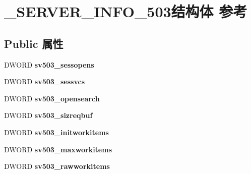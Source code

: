 \hypertarget{struct___s_e_r_v_e_r___i_n_f_o__503}{}\section{\+\_\+\+S\+E\+R\+V\+E\+R\+\_\+\+I\+N\+F\+O\+\_\+503结构体 参考}
\label{struct___s_e_r_v_e_r___i_n_f_o__503}
\subsection*{Public 属性}
\begin{DoxyCompactItemize}
\item 
\mbox{\label{struct___s_e_r_v_e_r___i_n_f_o__503_ad8471e332fc87158cc2d3b8557475ea1}} 
D\+W\+O\+RD {\bfseries sv503\+\_\+sessopens}
\item 
\mbox{\label{struct___s_e_r_v_e_r___i_n_f_o__503_afc8ad570061945d81d29198525f33ae2}} 
D\+W\+O\+RD {\bfseries sv503\+\_\+sessvcs}
\item 
\mbox{\label{struct___s_e_r_v_e_r___i_n_f_o__503_aa1f93fb4b3702563226c7869852b3f7f}} 
D\+W\+O\+RD {\bfseries sv503\+\_\+opensearch}
\item 
\mbox{\label{struct___s_e_r_v_e_r___i_n_f_o__503_a1072a5c28ac1b19fe699cf316b8a1ee1}} 
D\+W\+O\+RD {\bfseries sv503\+\_\+sizreqbuf}
\item 
\mbox{\label{struct___s_e_r_v_e_r___i_n_f_o__503_a686a9f1490e97c6ead0a5b4523ecccdc}} 
D\+W\+O\+RD {\bfseries sv503\+\_\+initworkitems}
\item 
\mbox{\label{struct___s_e_r_v_e_r___i_n_f_o__503_a4d3fc0d76497ab48be65cfbbfc7f2f23}} 
D\+W\+O\+RD {\bfseries sv503\+\_\+maxworkitems}
\item 
\mbox{\label{struct___s_e_r_v_e_r___i_n_f_o__503_ac785f734cceabb63d2b1c9a38426afb5}} 
D\+W\+O\+RD {\bfseries sv503\+\_\+rawworkitems}
\item 
\mbox{\label{struct___s_e_r_v_e_r___i_n_f_o__503_a189227b27950d4e3fbf23ccb4600c1de}} 

\end{DoxyCompactItemize}
